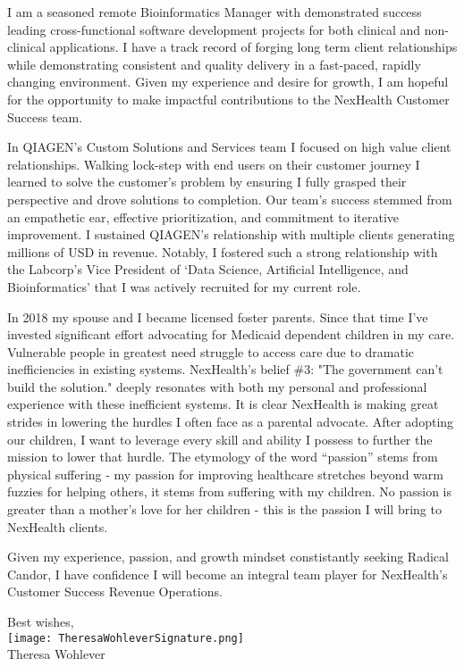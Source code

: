 \documentclass[10pt,letterpaper]{article}
\begin{document}
\begin{flushleft}
	I am a seasoned remote Bioinformatics Manager with demonstrated success leading cross-functional software development projects for both clinical and non-clinical applications. I have a track record of forging long term client relationships while demonstrating consistent and quality delivery in a fast-paced, rapidly changing environment. Given my experience and desire for growth, I am hopeful for the opportunity to make impactful contributions to the NexHealth Customer Success team.

	In QIAGEN's Custom Solutions and Services team I focused on high value client relationships. Walking lock-step with end users on their customer journey I learned to solve the customer's problem by ensuring I fully grasped their perspective and drove solutions to completion. Our team's success stemmed from an empathetic ear, effective prioritization, and commitment to iterative improvement. I sustained QIAGEN's relationship with multiple clients generating millions of USD in revenue. Notably, I fostered such a strong relationship with the Labcorp\rq{}s Vice President of \lq{}Data Science, Artificial Intelligence, and Bioinformatics\rq{} that I was actively recruited for my current role. 
	 
	In 2018 my spouse and I became licensed foster parents. Since that time I've invested significant effort advocating for Medicaid dependent children in my care. Vulnerable people in greatest need struggle to access care due to dramatic inefficiencies in existing systems. NexHealth's belief \#3: "The government can\rq{}t build the solution." deeply resonates with both my personal and professional experience with these inefficient systems. It is clear NexHealth is making great strides in lowering the hurdles I often face as a parental advocate. After adopting our children, I want to leverage every skill and ability I possess to further the mission to lower that hurdle. The etymology of the word “passion” stems from physical suffering - my passion for improving healthcare stretches beyond warm fuzzies for helping others, it stems from suffering with my children. No passion is greater than a mother\rq{}s love for her children - this is the passion I will bring to NexHealth clients.
	
	Given my experience, passion, and growth mindset constistantly seeking Radical Candor, I have confidence I will become an integral team player for NexHealth's Customer Success Revenue Operations.	
\end{flushleft}




\hspace*{.6\linewidth} Best wishes, \\
\hspace*{.57\linewidth} \texttt{[image: TheresaWohleverSignature.png]}  {\vspace{-9pt}} \\
\hspace*{.6\linewidth}  Theresa Wohlever
\end{document}

